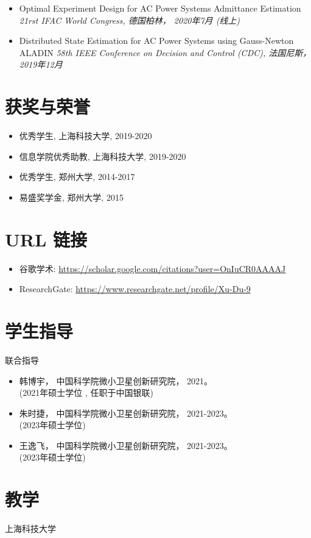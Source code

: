 \documentclass[paper=a4,fontsize=11pt]{scrartcl} %
\newcommand{\sepspace}{\vspace*{1em}}		%
\newcommand{\NewPart}[1]{\section*{\uppercase{#1}}}
\newcommand{\EducationEntry}[4]{
		\noindent \textbf{#1} \hfill      %
		\colorbox{White}{%
			\parbox{5cm}{%
			\hfill\color{Black}#2}} \par  %
		\noindent \textit{#3} \par        %
		\noindent\hangindent=2em\hangafter=0 \small #4 %
		\normalsize \par}
\begin{document}
\begin{CJK*}{UTF8}{gbsn}
\begin{itemize}
	\item  {
		Optimal Experiment Design for AC Power Systems Admittance Estimation\\
		\emph{21rst IFAC World Congress, 德国柏林， 2020年7月 (线上)
	} }
	
	\item  {
		Distributed State Estimation for AC Power Systems using Gauss-Newton ALADIN 
		\emph{58th IEEE Conference on Decision and Control (CDC),
			法国尼斯， 2019年12月} }
\end{itemize}


\NewPart{获奖与荣誉}
\begin{itemize}
	\item 优秀学生, 上海科技大学, 2019-2020
	
	\item 信息学院优秀助教, 上海科技大学, 2019-2020
		
	
	\item 优秀学生, 郑州大学, 2014-2017
	
	\item 易盛奖学金, 郑州大学, 2015
	
	
	\end{itemize}
%
\NewPart{URL 链接}
\begin{itemize}
	\item 谷歌学术: \url{https://scholar.google.com/citations?user=OnIuCR0AAAAJ}
	\item ResearchGate: \url{https://www.researchgate.net/profile/Xu-Du-9}
\end{itemize}
\NewPart{学生指导}{联合指导}
\begin{itemize}
	\item 韩博宇， 中国科学院微小卫星创新研究院， 2021。\\
	(2021年硕士学位 , 任职于中国银联)
	\item 朱时捷， 中国科学院微小卫星创新研究院， 2021-2023。\\
	(2023年硕士学位)
	\item 王逸飞， 中国科学院微小卫星创新研究院， 2021-2023。\\
	(2023年硕士学位)
\end{itemize}

\NewPart{教学}{上海科技大学}
\begin{itemize}
	

\end{itemize}
\end{CJK*}
\end{document}
